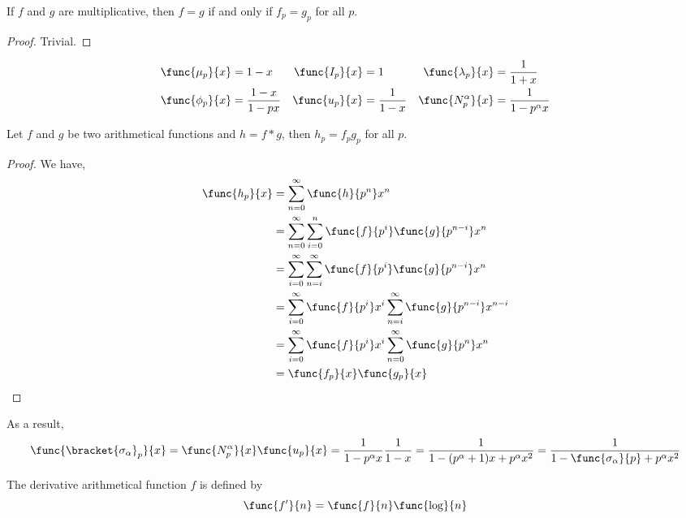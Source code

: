 \begin{theorem}
    If \(f\) and \(g\) are multiplicative, then \(f = g\) if and only if \(f_p = g_p\) for all \(p\). 
\end{theorem}
\begin{proof}
    Trivial.
\end{proof}
\begin{example}
    \begin{align*}
        \func{\mu_p}{x} &= 1-x & \func{I_p}{x} &= 1 & \func{\lambda_p}{x} &= \frac{1}{1 + x}\\
        \func{\phi_p}{x} &= \frac{1-x}{1 - px} & \func{u_p}{x} &= \frac{1}{1 - x} & \func{N^{\alpha}_p}{x} &= \frac{1}{1 - p^{\alpha} x} 
    \end{align*}
\end{example}
\begin{theorem}
    Let \(f\) and \(g\) be two arithmetical functions and \(h = f \ast g\), then \(h_p = f_p g_p\) for all \(p\).
\end{theorem}
\begin{proof}
    We have,
    \begin{align*}
        \func{h_p}{x} &= \sum_{n = 0}^{\infty} \func{h}{p^n} x^n\\
        &= \sum_{n = 0}^{\infty} \sum_{i = 0}^{n} \func{f}{p^i} \func{g}{p^{n-i}} x^n\\
        &= \sum_{i = 0}^{\infty} \sum_{n = i}^{\infty} \func{f}{p^i} \func{g}{p^{n-i}} x^n\\
        &= \sum_{i = 0}^{\infty}  \func{f}{p^i} x^i \sum_{n = i}^{\infty} \func{g}{p^{n-i}} x^{n-i}\\
        &= \sum_{i = 0}^{\infty}  \func{f}{p^i} x^i \sum_{n = 0}^{\infty} \func{g}{p^{n}} x^{n}\\
        &= \func{f_p}{x} \func{g_p}{x}
    \end{align*}
\end{proof}
As a result, 
\begin{equation*}
    \func{\bracket{\sigma_{\alpha}}_p}{x} = \func{N^{\alpha}_p}{x} \func{u_p}{x} = \frac{1}{1- p^{\alpha}x} \frac{1}{1- x} = \frac{1}{1 - (p^{\alpha} + 1)x + p^{\alpha}x^2} = \frac{1}{1 - \func{\sigma_{\alpha}}{p} + p^{\alpha} x^2}
\end{equation*}

\begin{definition}
    The derivative arithmetical function \(f\) is defined by 
    \begin{equation*}
        \func{f'}{n} = \func{f}{n} \func{\log}{n}
    \end{equation*}
\end{definition}

